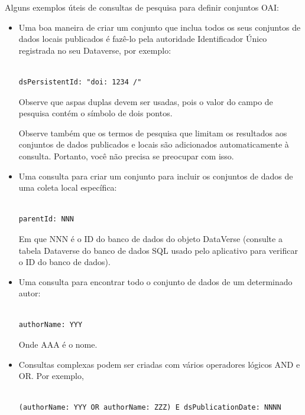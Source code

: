 \documentclass[12pt,hidelinks]{article}
\begin{document}
Alguns exemplos úteis de consultas de pesquisa para definir conjuntos OAI:

\begin{itemize}

 \item Uma boa maneira de criar um conjunto que inclua todos os seus conjuntos de dados locais publicados é fazê-lo pela autoridade Identificador Único registrada no seu Dataverse, por exemplo:
 
\begin{verbatim}

dsPersistentId: "doi: 1234 /"

\end{verbatim}

Observe que aspas duplas devem ser usadas, pois o valor do campo de pesquisa contém o símbolo de dois pontos.

Observe também que os termos de pesquisa que limitam os resultados aos conjuntos de dados publicados e locais são adicionados automaticamente à consulta. Portanto, você não precisa se preocupar com isso.

 \item Uma consulta para criar um conjunto para incluir os conjuntos de dados de uma coleta local específica:
 
\begin{verbatim}

parentId: NNN

\end{verbatim}

Em que NNN é o ID do banco de dados do objeto DataVerse (consulte a tabela Dataverse do banco de dados SQL usado pelo aplicativo para verificar o ID do banco de dados).

 \item Uma consulta para encontrar todo o conjunto de dados de um determinado autor:
 
\begin{verbatim}
 
authorName: YYY

\end{verbatim}

Onde AAA é o nome.

 \item Consultas complexas podem ser criadas com vários operadores lógicos AND e OR. Por exemplo,
 
 \begin{verbatim}
 
(authorName: YYY OR authorName: ZZZ) E dsPublicationDate: NNNN


\end{verbatim}
\end{itemize}
\end{document}
